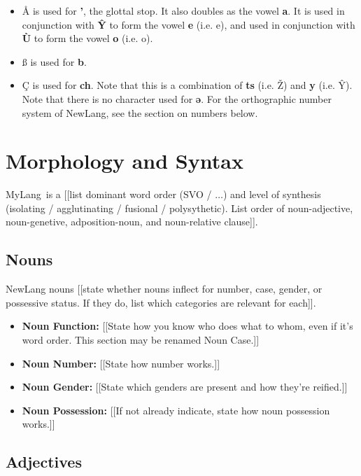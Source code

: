 \documentclass[oneside]{book}
\newcommand{\LanguageName}{MyLang}
\begin{document}
\begin{itemize}
\item
Å is used for \textbf{'}, the glottal stop.
It also doubles as the vowel \textbf{a}.
It is used in conjunction with \textbf{Ŷ} to form the vowel \textbf{e} (i.e. e), and used in conjunction with \textbf{Ù} to form the vowel \textbf{o} (i.e. o).
\item
ß is used for \textbf{b}.
\item
Ç is used for \textbf{ch}.
Note that this is a combination of \textbf{ts} (i.e. Ž) and \textbf{y} (i.e. Ŷ).
Note that there is no character used for \textbf{ǝ}.
For the orthographic number system of NewLang, see the section on numbers below.
\end{itemize}

\section{Morphology and Syntax}

\LanguageName\ is a [[list dominant word order (SVO / $\ldots$) and level of synthesis (isolating / agglutinating / fusional / polysythetic).
List order of noun-adjective, noun-genetive, adposition-noun, and noun-relative clause]].

\subsection{Nouns}

NewLang nouns [[state whether nouns inflect for number, case, gender, or possessive status.
If they do, list which categories are relevant for each]].

\begin{itemize}
\item
\textbf{Noun Function:}
[[State how you know who does what to whom, even if it's word order.
This section may be renamed Noun Case.]]
\item
\textbf{Noun Number:}
[[State how number works.]]
\item
\textbf{Noun Gender:}
[[State which genders are present and how they're reified.]]
\item
\textbf{Noun Possession:}
[[If not already indicate, state how noun possession works.]]
\end{itemize}

\subsection{Adjectives}
\end{document}
